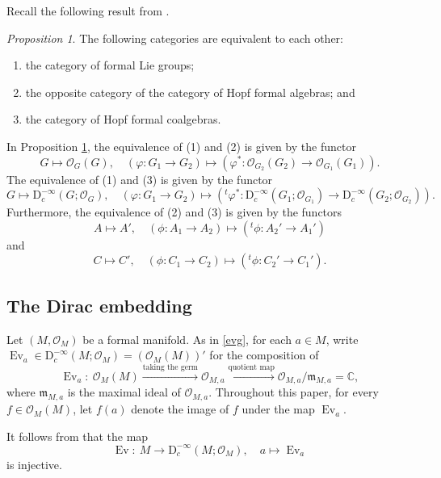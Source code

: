 \documentclass[12pt, a4paper]{amsart}
\newcommand{\CO}{{\mathcal {O}}}
\newcommand{\RD}{{\mathrm {D}}}
\newcommand{\Ev}{\operatorname{Ev}}
\newcommand{\m}{\mathfrak m}
\newcommand{\C}{\mathbb{C}}
\newcommand{\be}{\begin {equation}}
\newcommand{\ee}{\end {equation}}
\theoremstyle{Theorem}
\theoremstyle{Theorem}
\theoremstyle{Theorem}
\theoremstyle{Theorem}
\theoremstyle{Plain}
\theoremstyle{remark}
\theoremstyle{remark}
\theoremstyle{Definition}
\newtheorem{prpd}[dfn]{Proposition}
\numberwithin{equation}{section}
\begin{document}
Recall the following result from \cite[Proposition 9.2]{CSW4}. 
\begin{prpd}\label{prop:formalliegrouptohopfalg} 
The following categories are equivalent to each other:
\begin{enumerate}
	\item the category of formal Lie groups;
	\item the opposite category of the category of Hopf formal algebras; and 
	\item the category of Hopf formal coalgebras.
\end{enumerate}
\end{prpd}
In Proposition \ref{prop:formalliegrouptohopfalg}, 
the equivalence of (1) and (2) is given by the functor
\[G\mapsto \CO_G(G),\quad (\varphi:G_1\rightarrow G_2)\mapsto (\varphi^*: \CO_{G_2}(G_2)\rightarrow \CO_{G_1}(G_1)).\] 
The equivalence of (1) and (3) is given by the functor \[G\mapsto \RD^{-\infty}_c(G;\CO_G),\quad (\varphi: G_1\rightarrow G_2)\mapsto ({}^t\varphi^*:\RD^{-\infty}_c(G_1;\CO_{G_1})\rightarrow \RD^{-\infty}_c(G_2;\CO_{G_2})).\] 
Furthermore, 
the equivalence of (2) and (3) is given by the functors \[A\mapsto A', \quad (\phi: A_1\rightarrow A_2)\mapsto({}^t\phi: A_2'\rightarrow A_1') \]  and \[ C\mapsto C', \quad (\phi: C_1\rightarrow C_2)\mapsto({}^t\phi: C_2'\rightarrow C_1'). \] 
\subsection{The Dirac embedding}
Let $(M,\CO_M)$ be a formal manifold. 
As in \eqref{evg}, for each $a\in M$, write $\Ev_a\in \RD^{-\infty}_c(M;\CO_M)=(\CO_M(M))'$ for  the composition of 
\be\label{eq:Ev_a}\Ev_a:\ \CO_M(M)\xrightarrow{\textrm{taking the germ}} \CO_{M,a}\xrightarrow{\textrm{quotient map}} \CO_{M,a}/\m_{M,a}=\C, \ee where $\m_{M,a}$ is the maximal ideal of $\CO_{M,a}$. 
Throughout this paper, for every $f\in \CO_M(M)$, let $f(a)$ denote the image of $f$ under the map $\Ev_a$. 



It follows from \cite[Proposition 5.5 and Lemma 5.8]{CSW1} that the map 
\be\label{eq:Dirac} \Ev:\ M\rightarrow \RD^{-\infty}_c(M;\CO_M),\quad a\mapsto \Ev_a \ee
is injective. 
\end{document}
